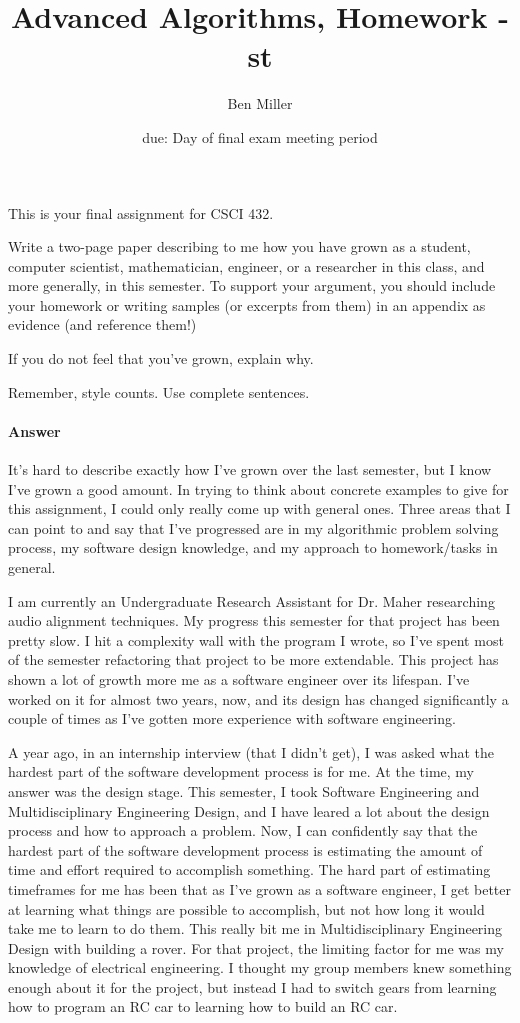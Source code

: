 \documentclass{article}
\title{Advanced Algorithms, Homework \hwnum -st}
\author{Ben Miller}
\date{due: Day of final exam meeting period}
\begin{document}
\maketitle

This is your final assignment for CSCI 432.

Write a two-page paper describing to me how you have grown as a student,
computer scientist, mathematician, engineer, or a researcher in this class, and
more generally, in this semester.  To support your argument, you should include
your homework or writing samples (or excerpts from them) in an appendix as
evidence (and reference them!)

If you do not feel that you've grown, explain why.

Remember, style counts. Use complete sentences.

\paragraph{Answer}

It's hard to describe exactly how I've grown over the last semester, but I know I've grown a good amount. In trying to think about concrete examples to give for this assignment, I could only really come up with general ones. Three areas that I can point to and say that I've progressed are in my algorithmic problem solving process, my software design knowledge, and my approach to homework/tasks in general.

I am currently an Undergraduate Research Assistant for Dr. Maher researching audio alignment techniques. My progress this semester for that project has been pretty slow. I hit a complexity wall with the program I wrote, so I've spent most of the semester refactoring that project to be more extendable. This project has shown a lot of growth more me as a software engineer over its lifespan. I've worked on it for almost two years, now, and its design has changed significantly a couple of times as I've gotten more experience with software engineering.

A year ago, in an internship interview (that I didn't get), I was asked what the hardest part of the software development process is for me. At the time, my answer was the design stage. This semester, I took Software Engineering and Multidisciplinary Engineering Design, and I have leared a lot about the design process and how to approach a problem. Now, I can confidently say that the hardest part of the software development process is estimating the amount of time and effort required to accomplish something. The hard part of estimating timeframes for me has been that as I've grown as a software engineer, I get better at learning what things are possible to accomplish, but not how long it would take me to learn to do them. This really bit me in Multidisciplinary Engineering Design with building a rover. For that project, the limiting factor for me was my knowledge of electrical engineering. I thought my group members knew something enough about it for the project, but instead I had to switch gears from learning how to program an RC car to learning how to build an RC car.
\end{document}
